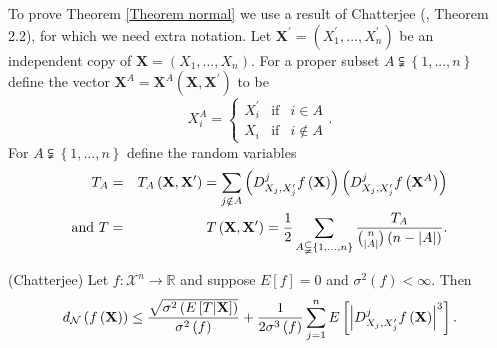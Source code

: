 \documentclass[final,12pt]{colt2018} %
\begin{document}
						To prove Theorem \ref{Theorem normal} we use a result of Chatterjee (\cite%
						{Chatterjee 2008}, Theorem 2.2), for which we need extra notation. Let $%
						\mathbf{X}^{\prime }=\left( X_{1}^{\prime },...,X_{n}^{\prime }\right) $ be
						an independent copy of $\mathbf{X}=\left( X_{1},...,X_{n}\right) $. For a
						proper subset $A\subsetneqq \left\{ 1,...,n\right\} $ define the vector $%
						\mathbf{X}^{A}=\mathbf{X}^{A}\left( \mathbf{X},\mathbf{X}^{\prime }\right) $
						to be 
						\begin{equation*}
						X_{i}^{A}=\left\{ 
						\begin{array}{ccc}
						X_{i}^{\prime } & \text{if} & i\in A \\ 
						X_{i} & \text{if} & i\notin A%
						\end{array}%
						\right. . 
						\end{equation*}%
						For $A\subsetneqq \left\{ 1,...,n\right\} $ define the random variables%
						\begin{eqnarray*}
							T_{A} &=&T_{A}\left( \mathbf{X},\mathbf{X}^{\prime }\right) =\sum_{j\notin
								A}\left( D_{X_{j},X_{j}^{\prime }}^{j}f\left( \mathbf{X}\right) \right)
							\left( D_{X_{j},X_{j}^{\prime }}^{j}f\left( \mathbf{X}^{A}\right) \right) \\
							\text{and }T &=&T\left( \mathbf{X},\mathbf{X}^{\prime }\right) =\frac{1}{2}%
							\sum_{A\subsetneqq \left\{ 1,...,n\right\} }\frac{T_{A}}{\binom{n}{%
									\left\vert A\right\vert }\left( n-\left\vert A\right\vert \right) }.
						\end{eqnarray*}
						
						\begin{theorem}
							\label{Theorem Chatterjee} (Chatterjee) Let $f:\mathcal{X}^{n}\rightarrow 
							\mathbb{R}
							$ and suppose $E\left[ f\right] =0$ and $\sigma ^{2}\left( f\right) <\infty
							. $ Then 
							\begin{equation}
							d_{\mathcal{N}}\left( f\left( \mathbf{X}\right) \right) \leq \frac{\sqrt{%
									\sigma ^{2}\left( E\left[ T|\mathbf{X}\right] \right) }}{\sigma ^{2}\left(
								f\right) }+\frac{1}{2\sigma ^{3}\left( f\right) }\sum_{j=1}^{n}E\left[
							\left\vert D_{X_{j},X_{j}^{\prime }}^{j}f\left( \mathbf{X}\right)
							\right\vert ^{3}\right] .  \label{Chatterjee bound}
							\end{equation}
						\end{theorem}
						
\end{document}
